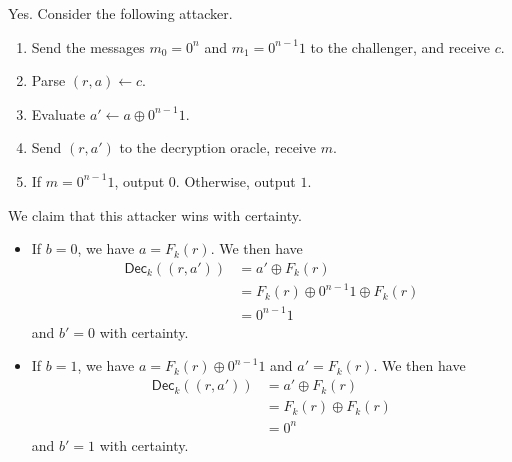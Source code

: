 \documentclass{article}
\theoremstyle{definition}
\begin{document}
Yes.
Consider the following attacker.
\begin{enumerate}
    \item Send the messages $m_0=0^n$ and $m_1=0^{n-1}1$ to the challenger, and receive $c$.
    \item Parse $(r, a)\gets c$.
    \item Evaluate $a'\gets a\oplus 0^{n-1}1$.
    \item Send $(r, a')$ to the decryption oracle, receive $m$.
    \item If $m=0^{n-1}1$, output $0$. Otherwise, output $1$.
\end{enumerate}
We claim that this attacker wins with certainty.
\begin{itemize}
    \item If $b=0$, we have $a=F_k(r)$.
    We then have
    \begin{align*}
        \mathsf{Dec}_k((r, a'))&=a' \oplus F_k(r) \\
        &= F_k(r)\oplus 0^{n-1}1\oplus F_k(r) \\
        &= 0^{n-1}1
    \end{align*}
    and $b'=0$ with certainty. 
    \item If $b=1$, we have $a=F_k(r)\oplus 0^{n-1}1$ and $a'=F_k(r)$.
    We then have
    \begin{align*}
        \mathsf{Dec}_k((r, a'))&=a' \oplus F_k(r) \\
        &= F_k(r)\oplus F_k(r) \\
        &= 0^n
    \end{align*}
    and $b'=1$ with certainty. 
\end{itemize}
\end{document}
